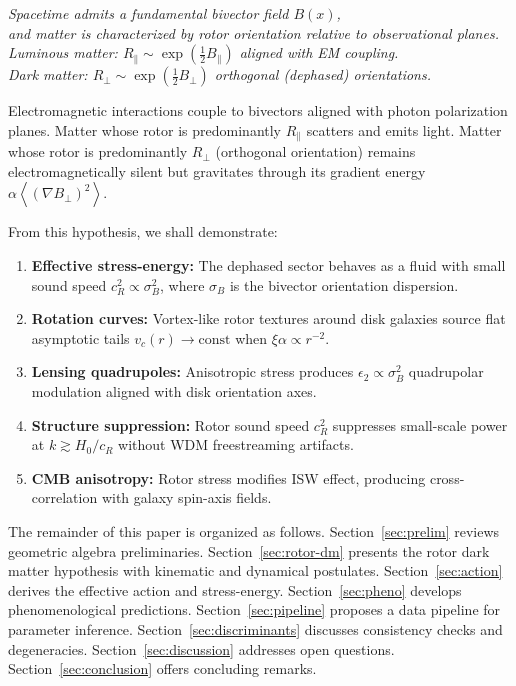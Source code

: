 \documentclass[11pt,a4paper]{article}
\numberwithin{equation}{section}
\theoremstyle{plain}
\theoremstyle{definition}
\theoremstyle{remark}
\newcommand{\avg}[1]{\left\langle #1 \right\rangle}
\begin{document}
\begin{center}
\textit{Spacetime admits a fundamental bivector field $B(x)$, \\
and matter is characterized by rotor orientation relative to observational planes. \\
Luminous matter: $R_\parallel \sim \exp(\tfrac12 B_\parallel)$ aligned with EM coupling. \\
Dark matter: $R_\perp \sim \exp(\tfrac12 B_\perp)$ orthogonal (dephased) orientations.}
\end{center}

Electromagnetic interactions couple to bivectors aligned with photon polarization planes. Matter whose rotor is predominantly $R_\parallel$ scatters and emits light. Matter whose rotor is predominantly $R_\perp$ (orthogonal orientation) remains electromagnetically silent but gravitates through its gradient energy $\alpha \avg{(\nabla B_\perp)^2}$.

From this hypothesis, we shall demonstrate:

\begin{enumerate}[leftmargin=*,itemsep=3pt]
  \item \textbf{Effective stress-energy:} The dephased sector behaves as a fluid with small sound speed $c_R^2\propto\sigma_B^2$, where $\sigma_B$ is the bivector orientation dispersion.
  \item \textbf{Rotation curves:} Vortex-like rotor textures around disk galaxies source flat asymptotic tails $v_c(r)\to\text{const}$ when $\xi\alpha\propto r^{-2}$.
  \item \textbf{Lensing quadrupoles:} Anisotropic stress produces $\epsilon_2\propto\sigma_B^2$ quadrupolar modulation aligned with disk orientation axes.
  \item \textbf{Structure suppression:} Rotor sound speed $c_R^2$ suppresses small-scale power at $k\gtrsim H_0/c_R$ without WDM freestreaming artifacts.
  \item \textbf{CMB anisotropy:} Rotor stress modifies ISW effect, producing cross-correlation with galaxy spin-axis fields.
\end{enumerate}

The remainder of this paper is organized as follows. Section~\ref{sec:prelim} reviews geometric algebra preliminaries. Section~\ref{sec:rotor-dm} presents the rotor dark matter hypothesis with kinematic and dynamical postulates. Section~\ref{sec:action} derives the effective action and stress-energy. Section~\ref{sec:pheno} develops phenomenological predictions. Section~\ref{sec:pipeline} proposes a data pipeline for parameter inference. Section~\ref{sec:discriminants} discusses consistency checks and degeneracies. Section~\ref{sec:discussion} addresses open questions. Section~\ref{sec:conclusion} offers concluding remarks.
\end{document}
